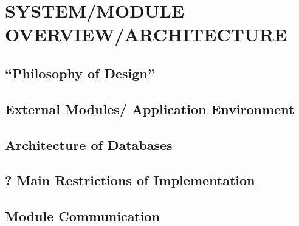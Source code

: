 \documentclass[a4paper,twoside]{tce}
\begin{document}
\chapter{SYSTEM/MODULE OVERVIEW/ARCHITECTURE}

\section{``Philosophy of Design''}



\section{External Modules/ Application Environment}



\section{Architecture of Databases}


\section{? Main Restrictions of Implementation}


\section{Module Communication}
\end{document}
